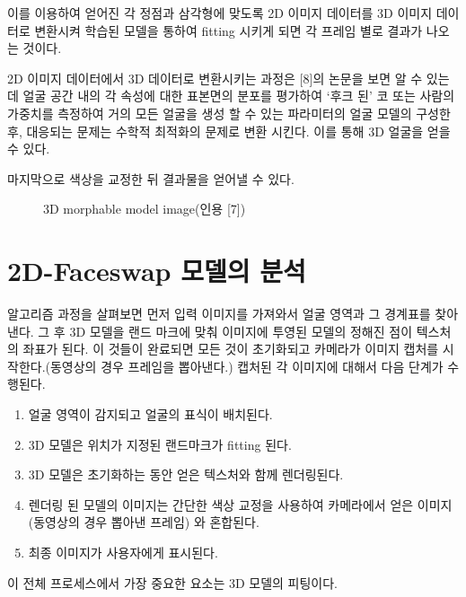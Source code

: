 \documentclass{oblivoir}
\begin{document}
이를 이용하여 얻어진 각 정점과 삼각형에 맞도록 2D 이미지 데이터를 3D 이미지 데이터로 변환시켜 학습된 모델을 통하여 fitting 시키게 되면 각 프레임 별로 결과가 나오는 것이다.

2D 이미지 데이터에서 3D 데이터로 변환시키는 과정은 [8]의 논문을 보면 알 수 있는데 
얼굴 공간 내의 각 속성에 대한 표본면의 분포를 평가하여 ‘후크 된’ 코 또는 사람의 가중치를 측정하여 거의 모든 얼굴을 생성 할 수 있는 파라미터의 얼굴 모델의 구성한 후, 대응되는 문제는 수학적 최적화의 문제로 변환 시킨다. 이를 통해 3D 얼굴을 얻을 수 있다.

마지막으로 색상을 교정한 뒤 결과물을 얻어낼 수 있다.

\begin{figure}[h!]
    \centering
\caption{ 3D morphable model image(인용 [7])}
\end{figure}


 \section{2D-Faceswap 모델의 분석}

알고리즘 과정을 살펴보면 먼저 입력 이미지를 가져와서 얼굴 영역과 그 경계표를 찾아낸다. 그 후 3D 모델을 랜드 마크에 맞춰 이미지에 투영된 모델의 정해진 점이 텍스처의 좌표가 된다. 이 것들이 완료되면 모든 것이 초기화되고 카메라가 이미지 캡처를 시작한다.(동영상의 경우 프레임을 뽑아낸다.) 캡처된 각 이미지에 대해서 다음 단계가 수행된다.

\begin{enumerate}
    \item 얼굴 영역이 감지되고 얼굴의 표식이 배치된다.
    \item 3D 모델은 위치가 지정된 랜드마크가 fitting 된다.
    \item 3D 모델은 초기화하는 동안 얻은 텍스처와 함께 렌더링된다.
    \item 렌더링 된 모델의 이미지는 간단한 색상 교정을 사용하여 카메라에서 얻은 이미지(동영상의 경우 뽑아낸 프레임) 와 혼합된다.
    \item 최종 이미지가 사용자에게 표시된다.
\end{enumerate}

이 전체 프로세스에서 가장 중요한 요소는 3D 모델의 피팅이다. 
\end{document}
